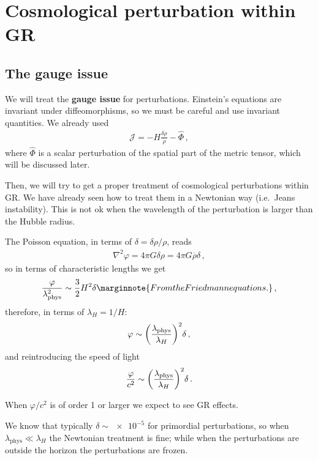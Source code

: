\documentclass[main.tex]{subfiles}
\begin{document}
\chapter{Cosmological perturbation within GR}

\section{The gauge issue}

We will treat the \textbf{gauge issue} for perturbations. Einstein's equations are invariant under diffeomorphisms, so we must be careful and use invariant quantities. 
We already used 
%
\begin{align}
\mathcal{J} = - H \frac{ \delta \rho}{\dot{\rho} } - \hat{\Phi}
\,,
\end{align}
%
where \(\hat{\Phi}\) is a scalar perturbation of the spatial part of the metric tensor, which will be discussed later. 

Then, we will try to get a proper treatment of cosmological perturbations within GR.
We have already seen how to treat them in a Newtonian way (i.e.\ Jeans instability). 
This is not ok when the wavelength of the perturbation is larger than the Hubble radius.

The Poisson equation, in terms of \(\delta = \delta \rho / \rho \), reads 
%
\begin{align}
\nabla^2 \varphi = 4 \pi G \delta \rho  = 4 \pi G \overline{\rho} \delta 
\,,
\end{align}
%
so in terms of characteristic lengths we get 
%
\begin{align}
\frac{\varphi}{\lambda^2 _{\text{phys}}} \sim \frac{3}{2} H^2 \delta 
\marginnote{From the Friedmann equations.}
\,,
\end{align}
%
therefore, in terms of \(\lambda _H = 1 / H\):
%
\begin{align}
\varphi \sim \qty(\frac{\lambda _{\text{phys}}}{\lambda _H})^2 \delta 
\,,
\end{align}
%
and reintroducing the speed of light 
%
\begin{align}
\frac{\varphi}{c^2} \sim \qty(\frac{\lambda _{\text{phys}}}{\lambda _H})^2 \delta 
\,.
\end{align}

When \(\varphi / c^2\) is of order 1 or larger we expect to see GR effects.

We know that typically \(\delta \sim \num{e-5}\) for primordial perturbations, so when \(\lambda _{\text{phys}} \ll \lambda _H\) the Newtonian treatment is fine; while when the perturbations are outside the horizon the perturbations are frozen. 
\end{document}
